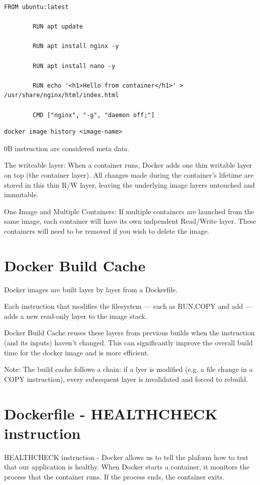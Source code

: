 \documentclass[11pt]{book}
\begin{document}
    \begin{lstlisting}[style=dockerstyle,caption={Example Dockerfile}]
        FROM ubuntu:latest

        RUN apt update

        RUN apt install nginx -y

        RUN apt install nano -y

        RUN echo '<h1>Hello from container</h1>' > /usr/share/nginx/html/index.html

        CMD ["nginx", "-g", "daemon off;"]
    \end{lstlisting}

    \begin{lstlisting}[style=terminal]
        docker image history <image-name>
    \end{lstlisting}

    0B instruction are considered meta data.

    The writeable layer:
    When a container runs, Docker adds one thin writable layer on top (the container layer).
    All changes made during the container's lifetime are stored in this thin R/W layer, leaving the underlying image layers untouched and immutable.

    One Image and Multiple Containers:
    If multiple containers are launched from the same image, each container will have its own indpendent Read/Write layer.
    These containers will need to be removed if you wish to delete the image.

    \section{Docker Build Cache}
    Docker images are built layer by layer from a Dockerfile.

    Each instruction that modifies the filesystem --- such as RUN,COPY and add --- adds a new read-only layer to the image stack.

    Docker Build Cache reuses these layers from previous builds when the instruction (and its inputs) haven't changed.
    This can significantly improve the overall build time for the docker image and is more efficient.

    Note:
    The build cache follows a chain: if a lyer is modified (e.g. a file change in a COPY instruction), every subsequent layer is invalidated and forced to rebuild.


    \section{Dockerfile - HEALTHCHECK instruction}
    HEALTHCHECK instruction - Docker allows us to tell the plaform how to test that our application is healthy.
    When Docker starts a container, it monitors the process that the container runs. If the process ends, the container exits.
\end{document}
